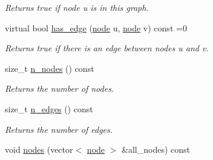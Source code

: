 \begin{DoxyCompactItemize}
\begin{DoxyCompactList}\small\item\em Returns true if node {\itshape u} is in this graph. \end{DoxyCompactList}\item 
virtual bool \hyperlink{classlgraph_1_1utils_1_1xxgraph_a9e94100afc70b09049432f196550407c}{has\+\_\+edge} (\hyperlink{namespacelgraph_1_1utils_a7bd66ede3805ef121bc2835bd48de0cf}{node} u, \hyperlink{namespacelgraph_1_1utils_a7bd66ede3805ef121bc2835bd48de0cf}{node} v) const =0
\begin{DoxyCompactList}\small\item\em Returns true if there is an edge between nodes {\itshape u} and {\itshape v}. \end{DoxyCompactList}\item 
size\+\_\+t \hyperlink{classlgraph_1_1utils_1_1xxgraph_ad345f1fbf1dee34e1579b5aea9aef9b2}{n\+\_\+nodes} () const 
\begin{DoxyCompactList}\small\item\em Returns the number of nodes. \end{DoxyCompactList}\item 
size\+\_\+t \hyperlink{classlgraph_1_1utils_1_1xxgraph_af3f7c3835406c2cbf70479ae1c0253c9}{n\+\_\+edges} () const 
\begin{DoxyCompactList}\small\item\em Returns the number of edges. \end{DoxyCompactList}\item 
void \hyperlink{classlgraph_1_1utils_1_1xxgraph_a99f83387aa9f59b861e675251be5a3ad}{nodes} (vector$<$ \hyperlink{namespacelgraph_1_1utils_a7bd66ede3805ef121bc2835bd48de0cf}{node} $>$ \&all\+\_\+nodes) const \hypertarget{classlgraph_1_1utils_1_1xxgraph_a99f83387aa9f59b861e675251be5a3ad}{}\label{classlgraph_1_1utils_1_1xxgraph_a99f83387aa9f59b861e675251be5a3ad}


\end{DoxyCompactItemize}
